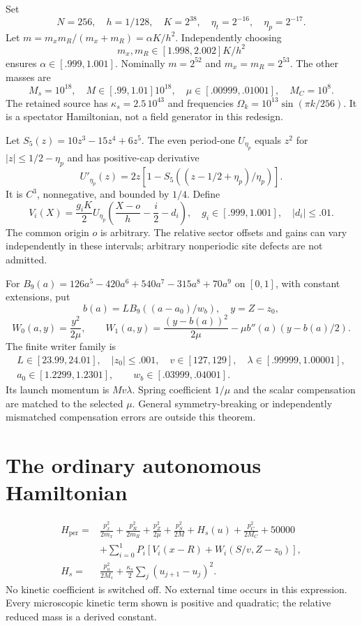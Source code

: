 \documentclass[11pt]{article}
\theoremstyle{definition}\newtheorem{definition}[theorem]{Definition}
\theoremstyle{remark}\newtheorem{remark}[theorem]{Remark}
\begin{document}
Set
\[
 N=256,\quad h=1/128,\quad K=2^{38},\quad
 \eta_t=2^{-16},\quad\eta_p=2^{-17}.
\]
Let $m= m_xm_R/(m_x+m_R)=\alpha K/h^2$. Independently choosing
\[
 m_x,m_R\in[1.998,2.002]K/h^2
\]
ensures $\alpha\in[.999,1.001]$. Nominally $m=2^{52}$ and $m_x=m_R=2^{53}$. The other masses are
\[
 M_s=10^{18},\quad M\in[.99,1.01]10^{18},\quad
 \mu\in[.00999,.01001],\quad M_C=10^8.
\]
The retained source has $\kappa_s=2.5\,10^{43}$ and frequencies $\Omega_k=10^{13}\sin(\pi k/256)$. It is a spectator Hamiltonian, not a field generator in this redesign.

Let $S_5(z)=10z^3-15z^4+6z^5$. The even period-one $U_{\eta_p}$ equals $z^2$ for $|z|\le1/2-\eta_p$ and has positive-cap derivative
\[
 U'_{\eta_p}(z)=2z\left[1-S_5((z-1/2+\eta_p)/\eta_p)\right].
\]
It is $C^3$, nonnegative, and bounded by $1/4$. Define
\[
 V_i(X)=\frac{g_iK}{2}U_{\eta_p}\left(\frac{X-o}{h}-\frac i2-d_i\right),
 \quad g_i\in[.999,1.001],\quad |d_i|\le.01.
\]
The common origin $o$ is arbitrary. The relative sector offsets and gains can vary independently in these intervals; arbitrary nonperiodic site defects are not admitted.

For $B_9(a)=126a^5-420a^6+540a^7-315a^8+70a^9$ on $[0,1]$, with constant extensions, put
\[
 b(a)=L B_9((a-a_0)/w_b),\quad y=Z-z_0,
\]
\[
 W_0(a,y)=\frac{y^2}{2\mu},\qquad
 W_1(a,y)=\frac{(y-b(a))^2}{2\mu}-\mu b''(a)(y-b(a)/2).
\]
The finite writer family is
\[
 \begin{gathered}
 L\in[23.99,24.01],\quad |z_0|\le.001,\quad v\in[127,129],\quad
 \lambda\in[.99999,1.00001],\\
 a_0\in[1.2299,1.2301],\qquad w_b\in[.03999,.04001].
 \end{gathered}
\]
Its launch momentum is $Mv\lambda$. Spring coefficient $1/\mu$ and the scalar compensation are matched to the selected $\mu$. General symmetry-breaking or independently mismatched compensation errors are outside this theorem.

\section{The ordinary autonomous Hamiltonian}
\begin{equation}\label{pm:eq:H}
\boxed{\begin{aligned}
 H_{\mathrm{per}}={}&\frac{p_x^2}{2m_x}+\frac{p_R^2}{2m_R}
 +\frac{p_Z^2}{2\mu}+\frac{p_S^2}{2M}
 +H_s(u)+\frac{p_C^2}{2M_C}+50000\\
 &+\sum_{i=0}^1P_i[V_i(x-R)+W_i(S/v,Z-z_0)],\\
 H_s={}&\frac{p_u^2}{2M_s}+\frac{\kappa_s}{2}\sum_j(u_{j+1}-u_j)^2.
\end{aligned}}
\end{equation}
No kinetic coefficient is switched off. No external time occurs in this expression. Every microscopic kinetic term shown is positive and quadratic; the relative reduced mass is a derived constant.
\end{document}
